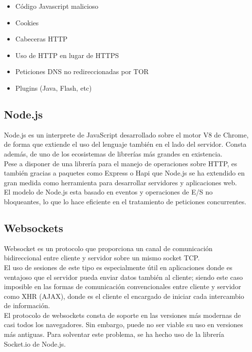 \begin{itemize}  
	\item  Código Javascript malicioso
	\item  Cookies
	\item  Cabeceras HTTP
	\item  Uso de HTTP en lugar de HTTPS
	\item Peticiones DNS no redireccionadas por TOR
	\item  Plugins (Java, Flash, etc)
\end{itemize}

\subsection {Node.js}

Node.js es un interprete de JavaScript desarrollado sobre el motor V8 de Chrome, de forma que extiende el uso del lenguaje también en el lado del servidor. Consta además, de uno de los ecosistemas de librerías más grandes en existencia. \\

Pese a disponer de una librería para el manejo de operaciones sobre HTTP, es también gracias a paquetes como Express o Hapi que Node.js se ha extendido en gran medida como herramienta para desarrollar servidores y aplicaciones web. \\
El modelo de Node.js esta basado en eventos y operaciones de E/S no bloqueantes, lo que lo hace eficiente en el tratamiento de peticiones concurrentes.

\subsection {Websockets}

Websocket es un protocolo que proporciona un canal de comunicación bidireccional entre cliente y servidor sobre un mismo socket TCP. \\

El uso de sesiones de este tipo es especialmente útil en aplicaciones donde es ventajoso que el servidor pueda enviar datos también al cliente; siendo este caso imposible en las formas de comunicación convencionales entre cliente y servidor como XHR (AJAX), donde es el cliente el encargado de iniciar cada intercambio de información. \\

El protocolo de websockets consta de soporte en las versiones más modernas de casi todos los navegadores. Sin embargo, puede no ser viable su uso en versiones más antiguas. Para solventar este problema, se ha hecho uso de la librería Socket.io de Node.js. \\

